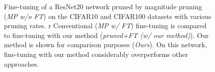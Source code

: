 \begin{figure}
\centering
{}
  \caption{ Fine-tuning of a ResNet20 network pruned by magnitude
  pruning (\emph{MP w/o FT}) on the CIFAR10 and CIFAR100 datasets with various
  pruning rates. r  Conventional (\emph{MP w/ FT}) fine-tuning is compared to
  fine-tuning with our method (\emph{pruned+FT (w/ our method)}). Our method is
  shown for comparison purposes (\emph{Ours}). On this network, fine-tuning with
  our method considerably overperforms other approaches.}
    \label{fig:chap1:finetuning_impact_resnet20}
\end{figure}


